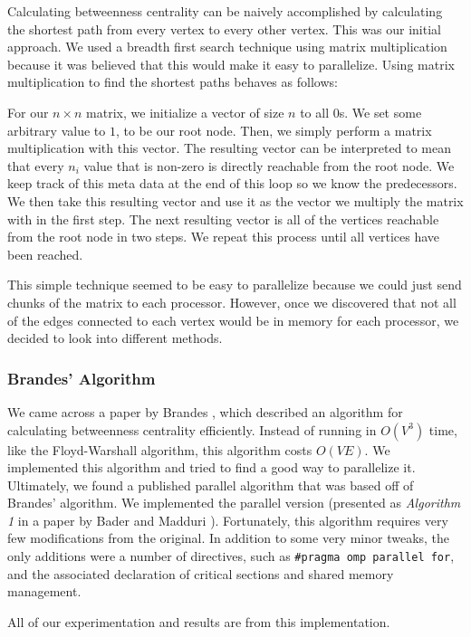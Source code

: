 \documentclass[11pt,a4paper,titlepage]{article}
\begin{document}
Calculating betweenness centrality can be naively accomplished by calculating
the shortest path from every vertex to every other vertex. This was our initial
approach. We used a breadth first search technique using matrix multiplication
because it was believed that this would make it easy to parallelize. Using
matrix multiplication to find the shortest paths behaves as follows:

For our $n \times n$ matrix, we initialize a vector of size $n$ to all $0$s. We
set some arbitrary value to $1$, to be our root node. Then, we simply perform a
matrix multiplication with this vector. The resulting vector can be
interpreted to mean that every $n_i$ value that is non-zero is directly
reachable from the root node. We keep track of this meta data at the end of
this loop so we know the predecessors. We then take this resulting vector and
use it as the vector we multiply the matrix with in the first step. The next
resulting vector is all of the vertices reachable from the root node in two
steps. We repeat this process until all vertices have been reached.

This simple technique seemed to be easy to parallelize because we could just
send chunks of the matrix to each processor. However, once we discovered that
not all of the edges connected to each vertex would be in memory for each
processor, we decided to look into different methods.


\subsubsection{Brandes' Algorithm}

We came across a paper by Brandes \cite{brandes2001faster}, which described an
algorithm for calculating betweenness centrality efficiently. Instead of
running in $O(V^3)$ time, like the Floyd-Warshall algorithm, this algorithm
costs $O(VE)$. We implemented this algorithm and tried to find a good way to
parallelize it. Ultimately, we found a published parallel algorithm that was
based off of Brandes' algorithm. We implemented the parallel version (presented
as \textit{Algorithm 1} in a paper by Bader and Madduri
\cite{bader2006parallel}). Fortunately, this algorithm requires very few
modifications from the original. In addition to some very minor tweaks, the
only additions were a number of directives, such as \texttt{\#pragma omp
parallel for}, and the associated declaration of critical sections and shared
memory management.

All of our experimentation and results are from this implementation.
\end{document}
